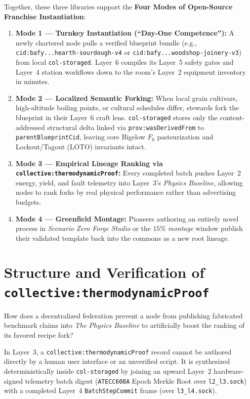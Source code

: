 Together, these three libraries support the \textbf{Four Modes of Open-Source Franchise Instantiation}:
\begin{enumerate}
    \item \textbf{Mode 1 — Turnkey Instantiation (``Day-One Competence''):} A newly chartered node pulls a verified blueprint bundle (e.g., \texttt{cid:bafy...hearth-sourdough-v4} or \texttt{cid:bafy...woodshop-joinery-v3}) from local \texttt{col-storaged}. Layer~6 compiles its Layer~5 safety gates and Layer~4 station workflows down to the room's Layer~2 equipment inventory in minutes.
    \item \textbf{Mode 2 — Localized Semantic Forking:} When local grain cultivars, high-altitude boiling points, or cultural schedules differ, stewards fork the blueprint in their Layer~6 craft lens. \texttt{col-storaged} stores only the content-addressed structural delta linked via \texttt{prov:wasDerivedFrom} to \texttt{parentBlueprintCid}, leaving core Bigelow $F_0$ pasteurization and Lockout/Tagout (LOTO) invariants intact.
    \item \textbf{Mode 3 — Empirical Lineage Ranking via \texttt{collective:thermodynamicProof}:} Every completed batch pushes Layer~2 energy, yield, and fault telemetry into Layer~3's \textit{Physics Baseline}, allowing nodes to rank forks by real physical performance rather than advertising budgets.
    \item \textbf{Mode 4 — Greenfield Montage:} Pioneers authoring an entirely novel process in \textit{Scenario Zero Forge Studio} or the $15\%$ \textit{montage} window publish their validated template back into the commons as a new root lineage.
\end{enumerate}

\section{Structure and Verification of \texttt{collective:thermodynamicProof}}
\label{sec:ch3-thermodynamic-proof}

How does a decentralized federation prevent a node from publishing fabricated benchmark claims into \textit{The Physics Baseline} to artificially boost the ranking of its favored recipe fork?

In Layer~3, a \texttt{collective:thermodynamicProof} record cannot be authored directly by a human user interface or an unverified script. It is synthesized deterministically inside \texttt{col-storaged} by joining an upward Layer~2 hardware-signed telemetry batch digest (\texttt{ATECC608A} Epoch Merkle Root over \texttt{l2\_l3.sock}) with a completed Layer~4 \texttt{BatchStepCommit} frame (over \texttt{l3\_l4.sock}).

